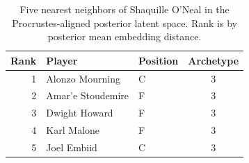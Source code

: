 \begin{table}[htbp]
  \centering\small
  \begin{tabular}{rllc}
    \toprule
    Rank & Player & Position & Archetype \\
    \midrule
    1 & Alonzo Mourning & C & 3 \\
    2 & Amar'e Stoudemire & F & 3 \\
    3 & Dwight Howard & F & 3 \\
    4 & Karl Malone & F & 3 \\
    5 & Joel Embiid & C & 3 \\
    \bottomrule
  \end{tabular}
  \caption{Five nearest neighbors of Shaquille O'Neal in the Procrustes-aligned posterior latent space. Rank is by posterior mean embedding distance.}
  \label{tab:Shaquille_O_Neal_neighbors}
\end{table}

